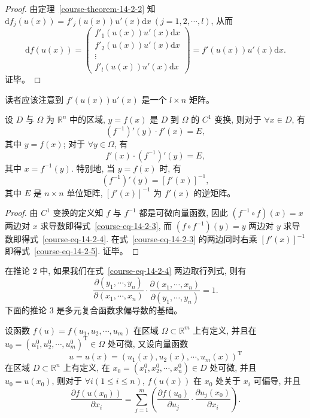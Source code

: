 \documentclass[12pt,fontset=fandol]{ctexart}
\begin{document}
\begin{proof}\quad 由定理~\ref{course-theorem-14-2-2}  知 $\mathrm df_j(u(x))=f'_j(u(x))u'(x)\mathrm dx\ (j=1,2,\cdots,l)$, 从而
\[
  \mathrm df(u(x))=
  \begin{pmatrix}
    f'_1(u(x))u'(x)\mathrm dx\\
    f'_2(u(x))u'(x)\mathrm dx\\
    \vdots\\
    f'_l(u(x))u'(x)\mathrm dx
  \end{pmatrix}
  =f'(u(x))u'(x)\mathrm dx.
\]
证毕。

\end{proof}
\begin{remark}\quad 读者应该注意到 $f'(u(x))u'(x)$ 是一个 $l\times n$ 矩阵。

\end{remark}
\noindent{}\quad 设 $D$ 与 $\Omega$ 为 $\mathbb R^n$ 中的区域, $y=f(x)$ 是 $D$ 到 $\Omega$ 的 $C^1$ 变换, 则对于 $\forall x\in D$, 有
\begin{equation}
  (f^{-1})'(y)\cdot f'(x)=E,
\label{course-eq-14-2-3}
\end{equation}
其中 $y=f(x)$; 对于 $\forall y\in\Omega$, 有
\begin{equation}
  f'(x)\cdot(f^{-1})'(y)=E,
\label{course-eq-14-2-4}
\end{equation}
其中 $x=f^{-1}(y)$. 特别地, 当 $y=f(x)$ 时, 有
\begin{equation}
  (f^{-1})'(y)=[f'(x)]^{-1},
\label{course-eq-14-2-5}
\end{equation}
其中 $E$ 是 $n\times n$ 单位矩阵, $[f'(x)]^{-1}$ 为 $f'(x)$ 的逆矩阵。

\begin{proof}\quad 由 $C^1$ 变换的定义知 $f$ 与 $f^{-1}$ 都是可微向量函数, 因此 $(f^{-1}\circ f)(x)=x$ 两边对 $x$ 求导数即得式~\eqref{course-eq-14-2-3}, 而 $(f\circ f^{-1})(y)=y$ 两边对 $y$ 求导数即得式~\eqref{course-eq-14-2-4}. 在式~\eqref{course-eq-14-2-3}  的两边同时右乘 $[f'(x)]^{-1}$ 即得式~\eqref{course-eq-14-2-5}. 证毕。

\end{proof}
\begin{remark}\quad 在推论 2 中, 如果我们在式~\eqref{course-eq-14-2-4}  两边取行列式, 则有
\begin{equation}
  \frac{\partial(y_1,\cdots,y_n)}{\partial(x_1,\cdots,x_n)}
  \cdot
  \frac{\partial(x_1,\cdots,x_n)}{\partial(y_1,\cdots,y_n)}
  =1.
\label{course-eq-14-2-6}
\end{equation}
下面的推论 3 是多元复合函数求偏导数的基础。

\end{remark}
\noindent{}\quad 设函数 $f(u)=f(u_1,u_2,\cdots,u_m)$ 在区域 $\Omega\subset\mathbb R^m$ 上有定义, 并且在 $u_0=(u_1^0,u_2^0,\cdots,u_m^0)^\mathrm T\in\Omega$ 处可微, 又设向量函数
\[
  u=u(x)=(u_1(x),u_2(x),\cdots,u_m(x))^\mathrm T
\]
在区域 $D\subset\mathbb R^n$ 上有定义, 在 $x_0=(x_1^0,x_2^0,\cdots,x_n^0)\in D$ 处可微, 并且 $u_0=u(x_0)$, 则对于 $\forall i(1\leqslant i\leqslant n)$, $f(u(x))$ 在 $x_0$ 处关于 $x_i$ 可偏导, 并且
\[
  \frac{\partial f(u(x_0))}{\partial x_i}
  =\sum_{j=1}^m\left(
  \frac{\partial f(u_0)}{\partial u_j}\cdot
  \frac{\partial u_j(x_0)}{\partial x_i}\right).
\]
\end{document}
